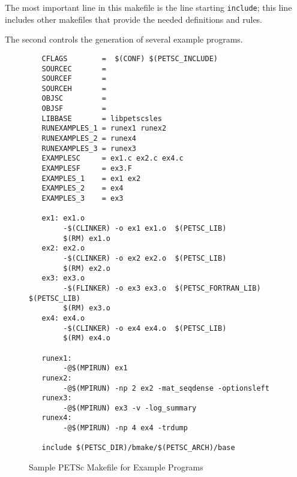 The most important line in this makefile is the line starting {\tt include}; 
this line includes other makefiles that provide the needed definitions and
rules.  

The second controls the generation of several example programs. 

\begin{figure}[H]
{\small
\begin{verbatim}
   CFLAGS        =  $(CONF) $(PETSC_INCLUDE)
   SOURCEC       = 
   SOURCEF       =
   SOURCEH       =
   OBJSC         =
   OBJSF         =
   LIBBASE       = libpetscsles
   RUNEXAMPLES_1 = runex1 runex2
   RUNEXAMPLES_2 = runex4
   RUNEXAMPLES_3 = runex3
   EXAMPLESC     = ex1.c ex2.c ex4.c
   EXAMPLESF     = ex3.F
   EXAMPLES_1    = ex1 ex2
   EXAMPLES_2    = ex4
   EXAMPLES_3    = ex3

   ex1: ex1.o 
        -$(CLINKER) -o ex1 ex1.o  $(PETSC_LIB)
        $(RM) ex1.o
   ex2: ex2.o 
        -$(CLINKER) -o ex2 ex2.o  $(PETSC_LIB)
        $(RM) ex2.o
   ex3: ex3.o 
        -$(FLINKER) -o ex3 ex3.o  $(PETSC_FORTRAN_LIB) $(PETSC_LIB)
        $(RM) ex3.o
   ex4: ex4.o 
        -$(CLINKER) -o ex4 ex4.o  $(PETSC_LIB)
        $(RM) ex4.o

   runex1:
        -@$(MPIRUN) ex1
   runex2:
        -@$(MPIRUN) -np 2 ex2 -mat_seqdense -optionsleft
   runex3:
        -@$(MPIRUN) ex3 -v -log_summary
   runex4:
        -@$(MPIRUN) -np 4 ex4 -trdump

   include $(PETSC_DIR)/bmake/$(PETSC_ARCH)/base
\end{verbatim}
}
\caption{Sample PETSc Makefile for Example Programs}
\label{fig:make2}
\end{figure}

